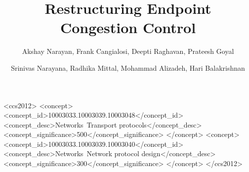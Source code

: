 \documentclass[format=sigconf,10pt,natbib=false]{acmart}
\begin{document}
\title{Restructuring Endpoint Congestion Control}
\author{Akshay Narayan, Frank Cangialosi, Deepti Raghavan, Prateesh Goyal}
\author{Srinivas Narayana, Radhika Mittal, Mohammad Alizadeh, Hari Balakrishnan}
\begin{CCSXML}
<ccs2012>
<concept>
<concept_id>10003033.10003039.10003048</concept_id>
<concept_desc>Networks~Transport protocols</concept_desc>
<concept_significance>500</concept_significance>
</concept>
<concept>
<concept_id>10003033.10003039.10003040</concept_id>
<concept_desc>Networks~Network protocol design</concept_desc>
<concept_significance>300</concept_significance>
</concept>
</ccs2012>
\end{CCSXML}

\newcommand*{\origrightarrow}{$\rightarrow$}
\let\oldarrow\textrightarrow
\renewcommand*{\textrightarrow}{\fontfamily{cmr}\selectfont\origrightarrow}
\renewcommand{\shortauthors}{}

\begin{sloppypar}

\maketitle












\end{sloppypar}
\end{document}
